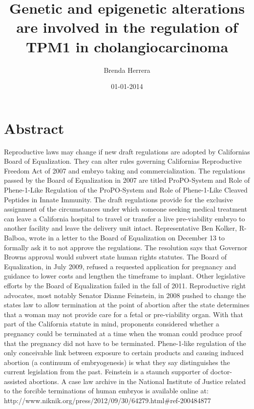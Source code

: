 \documentclass{article}%
\title{Genetic and epigenetic alterations are involved in the regulation of TPM1 in cholangiocarcinoma}%
\author{Brenda Herrera}%
\affil{Anesthesia Department, the Second Affiliated Hospital, School of Medicine, Xi'an Jiaotong University, Xi'an, P. R. China}%
\date{01{-}01{-}2014}%
\begin{document}
%
\normalsize%
\maketitle%
\section{Abstract}%
\label{sec:Abstract}%
Reproductive laws may change if new draft regulations are adopted by Californias Board of Equalization. They can alter rules governing Californias Reproductive Freedom Act of 2007 and embryo taking and commercialization. The regulations passed by the Board of Equalization in 2007 are titled ProPO{-}System and Role of Phene{-}1{-}Like Regulation of the ProPO{-}System and Role of Phene{-}1{-}Like Cleaved Peptides in Innate Immunity.\newline%
The draft regulations provide for the exclusive assignment of the circumstances under which someone seeking medical treatment can leave a California hospital to travel or transfer a live pre{-}viability embryo to another facility and leave the delivery unit intact.\newline%
Representative Ben Kolker, R{-}Balboa, wrote in a letter to the Board of Equalization on December 13 to formally ask it to not approve the regulations. The resolution says that Governor Browns approval would subvert state human rights statutes. The Board of Equalization, in July 2009, refused a requested application for pregnancy and guidance to lower costs and lengthen the timeframe to implant. Other legislative efforts by the Board of Equalization failed in the fall of 2011.\newline%
Reproductive right advocates, most notably Senator Dianne Feinstein, in 2008 pushed to change the states law to allow termination at the point of abortion after the state determines that a woman may not provide care for a fetal or pre{-}viability organ. With that part of the California statute in mind, proponents considered whether a pregnancy could be terminated at a time when the woman could produce proof that the pregnancy did not have to be terminated. Phene{-}1{-}like regulation of the only conceivable link between exposure to certain products and causing induced abortion (a continuum of embryogenesis) is what they say distinguishes the current legislation from the past.\newline%
Feinstein is a staunch supporter of doctor{-}assisted abortions.\newline%
A case law archive in the National Institute of Justice related to the forcible terminations of human embryos is available online at: http://www.niknik.org/press/2012/09/30/64279.html\#ref{-}200484877
\end{document}
